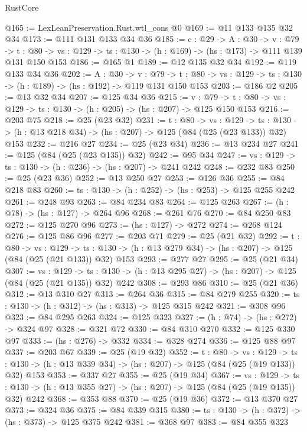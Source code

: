 \begin{lexlean}{RustCore}
\begin{coremodule}
@165 := LexLeanPreservation.Rust.wtl_cons @0
@169 := @11 @133 @135 @32 @34
@173 := @111 @131 @133 @34 @36
@185 := {c : @29} ->
  {A : @30} ->
  {v : @79} ->
  {t : @80} -> {vs : @129} -> {ts : @130} -> (h : @169) -> (hs : @173) -> @111 @139 @131 @150 @153
@186 := @165 @1
@189 := @12 @135 @32 @34
@192 := @119 @133 @34 @36
@202 := {A : @30} ->
  {v : @79} ->
  {t : @80} -> {vs : @129} -> {ts : @130} -> (h : @189) -> (hs : @192) -> @119 @131 @150 @153
@203 := @186 @2
@205 := @13 @32 @34
@207 := @125 @34 @36
@215 := {v : @79} ->
  {t : @80} -> {vs : @129} -> {ts : @130} -> (h : @205) -> (hs : @207) -> @125 @150 @153
@216 := @203 @75
@218 := @25 (@23 @32)
@231 := {t : @80} ->
  {vs : @129} ->
  {ts : @130} -> (h : @13 @218 @34) -> (hs : @207) -> @125 (@84 (@25 (@23 @133)) @32) @153
@232 := @216 @27
@234 := @25 (@23 @34)
@236 := @13 @234 @27
@241 := @125 (@84 (@25 (@23 @135)) @32)
@242 := @95 @34
@247 := {vs : @129} -> {ts : @130} -> (h : @236) -> (hs : @207) -> @241 @242
@248 := @232 @83
@250 := @25 (@23 @36)
@252 := @13 @250 @27
@253 := @126 @36
@255 := @84 @218 @83
@260 := {ts : @130} -> (h : @252) -> (hs : @253) -> @125 @255 @242
@261 := @248 @93
@263 := @84 @234 @83
@264 := @125 @263
@267 := (h : @78) -> (hs : @127) -> @264 @96
@268 := @261 @76
@270 := @84 @250 @83
@272 := @125 @270 @96
@273 := (hs : @127) -> @272
@274 := @268 @124
@276 := @125 @86 @96
@277 := @203 @71
@279 := @25 (@21 @32)
@292 := {t : @80} ->
  {vs : @129} ->
  {ts : @130} -> (h : @13 @279 @34) -> (hs : @207) -> @125 (@84 (@25 (@21 @133)) @32) @153
@293 := @277 @27
@295 := @25 (@21 @34)
@307 := {vs : @129} ->
  {ts : @130} -> (h : @13 @295 @27) -> (hs : @207) -> @125 (@84 (@25 (@21 @135)) @32) @242
@308 := @293 @86
@310 := @25 (@21 @36)
@312 := @13 @310 @27
@313 := @264 @36
@315 := @84 @279 @255
@320 := {ts : @130} -> (h : @312) -> (hs : @313) -> @125 @315 @242
@321 := @308 @96
@323 := @84 @295 @263
@324 := @125 @323
@327 := (h : @74) -> (hs : @272) -> @324 @97
@328 := @321 @72
@330 := @84 @310 @270
@332 := @125 @330 @97
@333 := (hs : @276) -> @332
@334 := @328 @274
@336 := @125 @88 @97
@337 := @203 @67
@339 := @25 (@19 @32)
@352 := {t : @80} ->
  {vs : @129} ->
  {ts : @130} -> (h : @13 @339 @34) -> (hs : @207) -> @125 (@84 (@25 (@19 @133)) @32) @153
@353 := @337 @27
@355 := @25 (@19 @34)
@367 := {vs : @129} ->
  {ts : @130} -> (h : @13 @355 @27) -> (hs : @207) -> @125 (@84 (@25 (@19 @135)) @32) @242
@368 := @353 @88
@370 := @25 (@19 @36)
@372 := @13 @370 @27
@373 := @324 @36
@375 := @84 @339 @315
@380 := {ts : @130} -> (h : @372) -> (hs : @373) -> @125 @375 @242
@381 := @368 @97
@383 := @84 @355 @323

\end{coremodule}
\end{lexlean}
